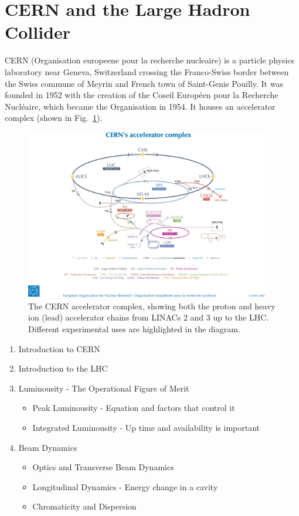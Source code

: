 \section{CERN and the Large Hadron Collider}

CERN (Organisation europeene pour la recherche nucleaire) is a particle physics laboratory near Geneva, Switzerland crossing the Franco-Swiss border between the Swiss commune of Meyrin and French town of Saint-Genis Pouilly. It was founded in 1952 with the creation of the Coseil Europ\'{e}en pour la Recherche Nucl\'{e}aire, which became the Organisation in 1954. It houses an accelerator complex (shown in Fig.~\ref{fig:CERN-acc-complex}).

\begin{figure}
\begin{center}
\includegraphics[width=0.95\textwidth]{Introduction/figures/cernaccelerators.jpg}
\end{center}
\label{fig:CERN-acc-complex}
\caption{The CERN accelerator complex, showing both the proton and heavy ion (lead) accelerator chains from LINACs 2 and 3 up to the LHC. Different experimental uses are highlighted in the diagram.}
\end{figure}

\begin{enumerate}
\item{Introduction to CERN}
\item{Introduction to the LHC}
\item{Luminousity - The Operational Figure of Merit}
\begin{itemize}
\item{Peak Luminousity - Equation and factors that control it}
\item{Integrated Luminousity - Up time and availability is important}
\end{itemize}
\item{Beam Dynamics}
\begin{itemize}
\item{Optics and Transverse Beam Dynamics}
\item{Longitudinal Dynamics - Energy change in a cavity}
\item{Chromaticity and Dispersion}
\end{itemize}
\end{enumerate}
